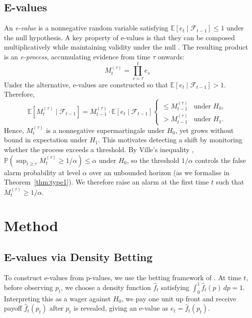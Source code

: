 \documentclass[ejsv2, noshowframe]{imsart}
\theoremstyle{plain}
\theoremstyle{definition}
\theoremstyle{remark}
\newcommand{\E}{\mathbb{E}}
\newcommand{\Prob}{\mathbb{P}}
\begin{document}
\subsection{E-values}
An \emph{e-value} is a nonnegative random variable satisfying $\E[e_t \mid \mathcal{F}_{t-1}] \leq 1$ under the null hypothesis. A key property of e-values is that they can be composed multiplicatively while maintaining validity under the null \citep{ramdas2023game}. The resulting product is an \emph{e-process}, accumulating evidence from time $\tau$ onwards:
\begin{equation}
 M_t^{(\tau)} = \prod_{s=\tau}^{t} e_s
\end{equation}
Under the alternative, e-values are constructed so that $\E[e_t \mid \mathcal{F}_{t-1}] > 1$. Therefore,
\begin{equation}
 \E[M_t^{(\tau)} \mid \mathcal{F}_{t-1}] = M_{t-1}^{(\tau)} \cdot \E[e_t \mid \mathcal{F}_{t-1}]
 \begin{cases} \leq M_{t-1}^{(\tau)} & \text{under } H_0, \\ > M_{t-1}^{(\tau)} & \text{under } H_1. \end{cases}
\end{equation}
Hence, $M_t^{(\tau)}$ is a nonnegative supermartingale under $H_0$, yet grows without bound in expectation under $H_1$. This motivates detecting a shift by monitoring whether the process exceeds a threshold. By Ville's inequality \citep{ville1939}, $\Prob(\sup_{t \geq \tau} M_t^{(\tau)} \geq 1/\alpha) \leq \alpha$ under $H_0$, so the threshold $1/\alpha$ controls the false alarm probability at level $\alpha$ over an unbounded horizon (as we formalise in Theorem~\ref{thm:type1}). We therefore raise an alarm at the first time $t$ such that $M_t^{(\tau)} \geq 1/\alpha$.

\section{Method}

\subsection{E-values via Density Betting}
\label{sec:density}

To construct e-values from p-values, we use the betting framework of \citet{ramdas2023game}. At time $t$, before observing $p_t$, we choose a density function $\hat{f}_t$ satisfying $\int_0^1 \hat{f}_t(p)\,dp=1$. Interpreting this as a wager against $H_0$, we pay one unit up front and receive payoff $\hat{f}_t(p_t)$ after $p_t$ is revealed, giving an e-value as $e_t = \hat{f}_t(p_t)$.
\end{document}
